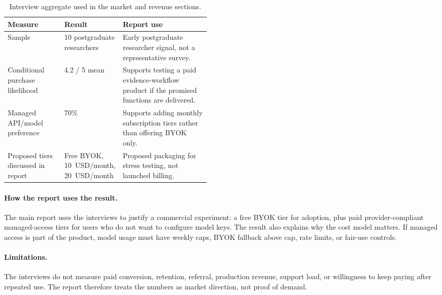 \begin{table}[h]
  \caption{Interview aggregate used in the market and revenue sections.}
  \label{tab:appendix-interview-validation}
  \centering
  \small
  \setlength{\tabcolsep}{4pt}
  \begin{tabularx}{\linewidth}{p{0.28\linewidth}p{0.18\linewidth}Y}
    \toprule
    Measure & Result & Report use \\
    \midrule
    Sample & 10 postgraduate researchers & Early postgraduate researcher signal, not a representative survey. \\
    Conditional purchase likelihood & 4.2 / 5 mean & Supports testing a paid evidence-workflow product if the promised functions are delivered. \\
    Managed API/model preference & 70\% & Supports adding monthly subscription tiers rather than offering BYOK only. \\
    Proposed tiers discussed in report & Free BYOK, 10~USD/month, 20~USD/month & Proposed packaging for stress testing, not launched billing. \\
    \bottomrule
  \end{tabularx}
\end{table}

\paragraph{How the report uses the result.}
The main report uses the interviews to justify a commercial experiment: a free BYOK tier for adoption, plus paid provider-compliant managed-access tiers for users who do not want to configure model keys. The result also explains why the cost model matters. If managed access is part of the product, model usage must have weekly caps, BYOK fallback above cap, rate limits, or fair-use controls.

\paragraph{Limitations.}
The interviews do not measure paid conversion, retention, referral, production revenue, support load, or willingness to keep paying after repeated use. The report therefore treats the numbers as market direction, not proof of demand.
